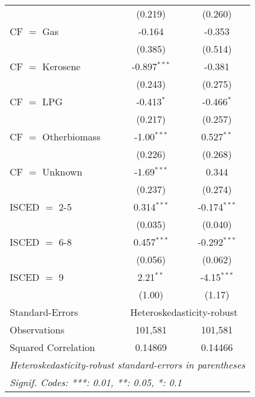 \begin{table}[htbp!]
\begin{adjustbox}{width = 1\textwidth, max height = 0.95\textheight, center}
\begin{threeparttable}[b]
\begin{tabular}{lcc}
                                 & (0.219)        & (0.260)\\   
            CF $=$ Gas           & -0.164         & -0.353\\   
                                 & (0.385)        & (0.514)\\   
            CF $=$ Kerosene      & -0.897$^{***}$ & -0.381\\   
                                 & (0.243)        & (0.275)\\   
            CF $=$ LPG           & -0.413$^{*}$   & -0.466$^{*}$\\   
                                 & (0.217)        & (0.257)\\   
            CF $=$ Otherbiomass  & -1.00$^{***}$  & 0.527$^{**}$\\   
                                 & (0.226)        & (0.268)\\   
            CF $=$ Unknown       & -1.69$^{***}$  & 0.344\\   
                                 & (0.237)        & (0.274)\\   
            ISCED $=$ 2-5        & 0.314$^{***}$  & -0.174$^{***}$\\   
                                 & (0.035)        & (0.040)\\   
            ISCED $=$ 6-8        & 0.457$^{***}$  & -0.292$^{***}$\\   
                                 & (0.056)        & (0.062)\\   
            ISCED $=$ 9          & 2.21$^{**}$    & -4.15$^{***}$\\   
                                 & (1.00)         & (1.17)\\   
            \midrule 
            Standard-Errors & \multicolumn{2}{c}{Heteroskedasticity-robust} \\ 
            Observations         & 101,581        & 101,581\\  
            Squared Correlation  & 0.14869        & 0.14466\\  
            \midrule \midrule
            \multicolumn{3}{l}{\emph{Heteroskedasticity-robust standard-errors in parentheses}}\\
            \multicolumn{3}{l}{\emph{Signif. Codes: ***: 0.01, **: 0.05, *: 0.1}}\\
         \end{tabular}
         

\end{threeparttable}
\end{adjustbox}
\end{table}
